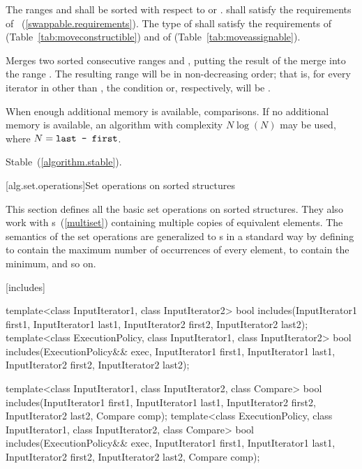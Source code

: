 \begin{itemdescr}
\pnum
\requires
The ranges  and  shall be
sorted with respect to  or .
 shall satisfy the requirements of
~(\ref{swappable.requirements}). The type
of  shall satisfy the requirements of
 (Table~\ref{tab:moveconstructible}) and of
 (Table~\ref{tab:moveassignable}).

\pnum
\effects
Merges two sorted consecutive ranges
and
,
putting the result of the merge into the range
.
The resulting range will be in non-decreasing order;
that is, for every iterator
in
other than
,
the condition
or, respectively,
will be .

\pnum
\complexity
When enough additional memory is available,
comparisons.
If no additional memory is available, an algorithm with complexity
$N \log(N)$ may be used, where $N = \texttt{last - first}$.

\pnum
\remarks Stable~(\ref{algorithm.stable}).
\end{itemdescr}

[alg.set.operations]{Set operations on sorted structures}

\pnum
This section defines all the basic set operations on sorted structures.
They also work with
s~(\ref{multiset})
containing multiple copies of equivalent elements.
The semantics of the set operations are generalized to
s
in a standard way by defining
to contain the maximum number of occurrences of every element,
to contain the minimum, and so on.

[includes]{}

%
\begin{itemdecl}
template<class InputIterator1, class InputIterator2>
  bool includes(InputIterator1 first1, InputIterator1 last1,
                InputIterator2 first2, InputIterator2 last2);
template<class ExecutionPolicy, class InputIterator1, class InputIterator2>
  bool includes(ExecutionPolicy&& exec,
                InputIterator1 first1, InputIterator1 last1,
                InputIterator2 first2, InputIterator2 last2);

template<class InputIterator1, class InputIterator2, class Compare>
  bool includes(InputIterator1 first1, InputIterator1 last1,
                InputIterator2 first2, InputIterator2 last2,
                Compare comp);
template<class ExecutionPolicy, class InputIterator1, class InputIterator2, class Compare>
  bool includes(ExecutionPolicy&& exec,
                InputIterator1 first1, InputIterator1 last1,
                InputIterator2 first2, InputIterator2 last2,
                Compare comp);
\end{itemdecl}

